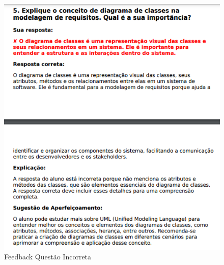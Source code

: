\begin{figure}[H]
    \centering
    \includegraphics[width=1\textwidth]{figuras/feedback_3.png}
    \caption{Feedback Questão Incorreta}
    \label{fig:report_questions}
\end{figure}